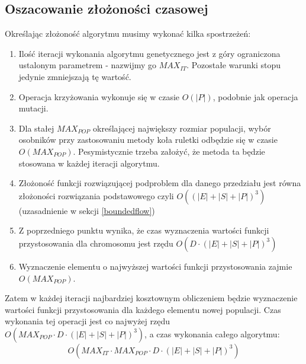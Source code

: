 \documentclass[12pt,a4paper]{article}
\theoremstyle{definition}
\begin{document}
\subsection{Oszacowanie złożoności czasowej} \label{complexity}
Określając złożoność algorytmu musimy wykonać kilka spostrzeżeń:
\begin{enumerate}
	\item Ilość iteracji wykonania algorytmu genetycznego jest z góry ograniczona ustalonym parametrem - nazwijmy go $MAX_{IT}$. Pozostałe warunki stopu jedynie zmniejszają tę wartość.
	\item Operacja krzyżowania wykonuje się w czasie $O(|P|)$, podobnie jak operacja mutacji.
	\item Dla stałej $MAX_{POP}$ określającej największy rozmiar populacji, wybór osobników przy zastosowaniu metody koła ruletki odbędzie się w czasie $O(MAX_{POP})$. Pesymistycznie trzeba założyć, że metoda ta będzie stosowana w każdej iteracji algorytmu.
	\item Złożoność funkcji rozwiązującej podproblem dla danego przedziału jest równa złożoności rozwiązania podstawowego czyli $O((|E| + |S| + |P|)^3)$ (uzasadnienie w sekcji \ref{boundedflow})
	\item Z poprzedniego punktu wynika, że czas wyznaczenia wartości funkcji przystosowania dla chromosomu jest rzędu $O(D \cdot (|E| + |S| + |P|)^3)$
	\item Wyznaczenie elementu o najwyższej wartości funkcji przystosowania zajmie \\$O(MAX_{POP})$.
\end{enumerate}
Zatem w każdej iteracji najbardziej kosztownym obliczeniem będzie wyznaczenie wartości funkcji przystosowania dla każdego elementu nowej populacji. Czas wykonania tej operacji jest co najwyżej rzędu $O(MAX_{POP} \cdot D \cdot (|E| + |S| + |P|)^3)$, a czas wykonania całego algorytmu:
$$O(MAX_{IT} \cdot MAX_{POP} \cdot D \cdot (|E| + |S| + |P|)^3)$$
\end{document}
